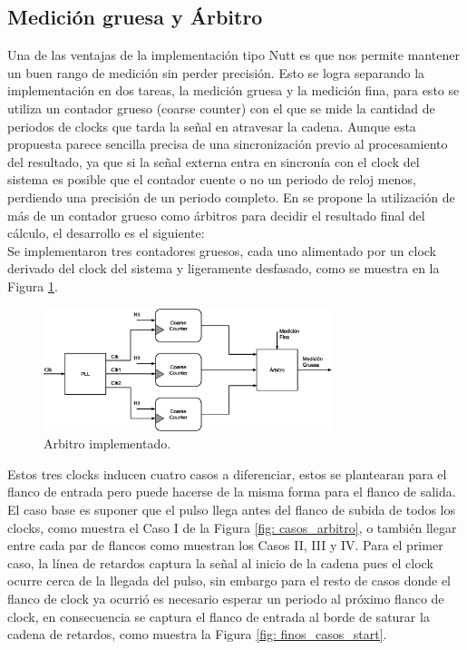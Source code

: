 \subsection{Medición gruesa y Árbitro}
Una de las ventajas de la implementación tipo Nutt es que nos permite mantener un buen rango de medición sin perder precisión. Esto se logra separando la implementación en dos tareas, 
la medición gruesa y la medición fina, para esto se utiliza un contador grueso (coarse counter) con el que se mide la cantidad de periodos de clocks que tarda la señal en atravesar la cadena.
Aunque esta propuesta parece sencilla precisa de una sincronización previo al procesamiento del resultado, ya que si la señal externa entra en sincronía con el clock del sistema es posible que
el contador cuente o no un periodo de reloj menos, perdiendo una precisión de un periodo completo. En \cite{machado_novel_2018} se propone la utilización de más de un contador grueso como árbitros
para decidir el resultado final del cálculo, el desarrollo es el siguiente:\\

Se implementaron tres contadores gruesos, cada uno alimentado por un clock derivado del clock del sistema y ligeramente desfasado, como se muestra
en la Figura \ref{fig: arbitro}.
\begin{figure}[H]
     \centering
     \includegraphics[width=0.75\textwidth]{imagenes/arbiter.eps}
     \caption{Arbitro implementado.}
     \label{fig: arbitro}
\end{figure}

Estos tres clocks inducen cuatro casos a diferenciar, estos se plantearan
para el flanco de entrada pero
puede hacerse de la misma forma para el flanco de salida.\\
El caso base es suponer que el pulso llega antes del flanco de subida de todos los clocks,
como muestra el Caso I de la Figura \ref{fig: casos_arbitro}, o también llegar entre cada par de flancos como muestran los Casos II, III y IV.
Para el primer caso, la línea de retardos captura la señal al inicio de la cadena pues el clock ocurre cerca de la llegada del pulso, sin embargo
para el resto de casos donde el flanco de clock ya ocurrió es necesario esperar un periodo al próximo flanco de clock, en consecuencia se captura el flanco de entrada
al borde de saturar la cadena de retardos, como muestra la Figura \ref{fig: finos_casos_start}.\\


